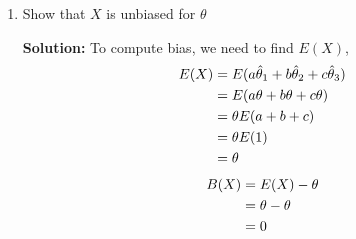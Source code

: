 \documentclass[12pt]{article}
\begin{document}
\begin{enumerate}
\begin{enumerate}
        \item 
        Show that $X$ is unbiased for $\theta$
        \begin{mybox} \textbf{Solution: }To compute bias, we need to find $E(X)$,
        \begin{align}
            E(X)
            &= E(a\hat{\theta}_1 + b\hat{\theta}_2 + c\hat{\theta}_3) \notag\\
            &= E(a\theta + b\theta + c\theta) \notag\\
            &= \theta E(a + b + c) \notag\\
            &= \theta E(1) \notag\\
            &= \theta \notag
        \end{align}
        \begin{align}
            B(X)
            &= E(X) - \theta \notag\\
            &= \theta - \theta \notag\\
            &= 0\notag
        \end{align}
            \begin{center}{\color{magenta}} \end{center}
        

\end{mybox}
\end{enumerate}
\end{enumerate}
\end{document}
